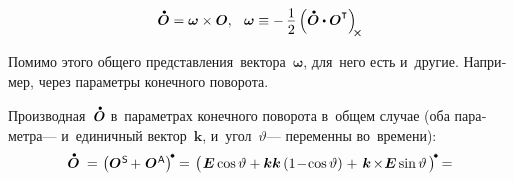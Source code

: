 \begin{otherlanguage}{russian}
\nopagebreak\vspace{-0.1em}\begin{equation}\label{angularvelocityvector}
\mathdotabove{\rotationtensor} = \bm{\omega} \times \rotationtensor, \;\:\:
\bm{\omega} \equiv -\, \displaystyle \onehalf \left( \mathdotabove{\rotationtensor} \dotp \rotationtensor^{\T} \right)_{\hspace{-0.2em}\Xcompanion}
\vspace{-0.25em}\end{equation}

Помимо этого общего представления~вектора~${\bm{\omega}}$, для~него есть и~другие. Например, через параметры конечного поворота.

Производная~${\mathdotabove{\rotationtensor}}$ в~параметрах конечного поворота в~общем случае (оба параметра\:--- и~единичный вектор~$\bm{k}$, и~угол~$\vartheta$\:--- переменны во~времени):
\vspace{.3em}%
\[
\begin{array}{r@{\hspace{.33em}}c@{\hspace{.25em}}l}
\mathdotabove{\rotationtensor} \hspace{.2em} & = & \hspace{.1em} \left(\rotationtensor^{\mathsf{\hspace{.12ex}S}} \hspace{-0.2ex} +^{\mathstrut} \rotationtensor^{\mathsf{\hspace{.12ex}A}}\right)^{\hspace{-0.2ex}\tikz[baseline=-0.5ex]\draw[black, fill=black] (0,0) circle (.266ex);} =
\hspace{.1em} \left(\hspace{.2ex} \tikzmark{StartBracePs} {\UnitDyad \operatorname{cos} \vartheta + \bm{k} \bm{k} \left({1 \!-\! \operatorname{cos} \vartheta}\right)} \hspace{-0.2ex} \tikzmark{EndBracePs} \hspace{.32ex} +^{\mathstrut} \hspace{.2ex}
\tikzmark{StartBracePa} {\bm{k} \hspace{-0.24ex}\times\hspace{-0.4ex} \UnitDyad \operatorname{sin} \vartheta \hspace{.2ex}} \tikzmark{EndBracePa} {} \hspace{.16ex}\right)^{\hspace{-0.2ex}\tikz[baseline=-0.5ex]\draw[black, fill=black] (0,0) circle (.266ex);} \hspace{-0.05em} =

\end{array}\]
\end{otherlanguage}

